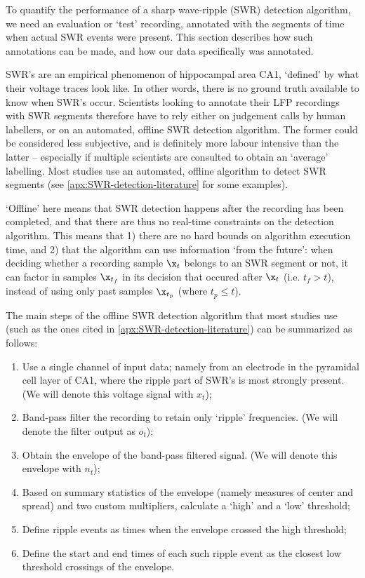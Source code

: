 \label{sec:offline}

To quantify the performance of a sharp wave-ripple (SWR) detection algorithm, we need an evaluation or `test' recording, annotated with the segments of time when actual SWR events were present. This section describes how such annotations can be made, and how our data specifically was annotated.

SWR's are an empirical phenomenon of hippocampal area CA1, `defined' by what their voltage traces look like. In other words, there is no ground truth available to know when SWR's occur. Scientists looking to annotate their LFP recordings with SWR segments therefore have to rely either on judgement calls by human labellers, or on an automated, offline SWR detection algorithm. The former could be considered less subjective, and is definitely more labour intensive than the latter -- especially if multiple scientists are consulted to obtain an `average' labelling. Most studies use an automated, offline algorithm to detect SWR segments (see \cref{apx:SWR-detection-literature} for some examples).

`Offline' here means that SWR detection happens after the recording has been completed, and that there are thus no real-time constraints on the detection algorithm. This means that 1) there are no hard bounds on algorithm execution time, and 2) that the algorithm can use information `from the future': when deciding whether a recording sample $\x_t$ belongs to an SWR segment or not, it can factor in samples $\x_{t_f}$ in its decision that occured after $\x_t$ (i.e. $t_f > t$), instead of using only past samples $\x_{t_p}$ (where $t_p \leq t$).

The main steps of the offline SWR detection algorithm that most studies use (such as the ones cited in \cref{apx:SWR-detection-literature}) can be summarized as follows:
\begin{enumerate}
\item Use a single channel of input data; namely from an electrode in the pyramidal cell layer of CA1, where the ripple part of SWR's is most strongly present. (We will denote this voltage signal with $x_t$);
\item Band-pass filter the recording to retain only `ripple' frequencies. (We will denote the filter output as $o_t$);
\item Obtain the envelope of the band-pass filtered signal. (We will denote this envelope with $n_t$);
\item Based on summary statistics of the envelope (namely measures of center and spread) and two custom multipliers, calculate a `high' and a `low' threshold;
\item Define ripple events as times when the envelope crossed the high threshold;
\item Define the start and end times of each such ripple event as the closest low threshold crossings of the envelope.
\end{enumerate}


